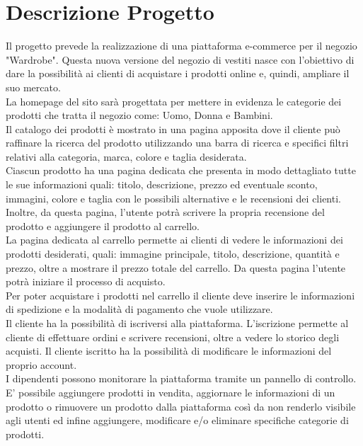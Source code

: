 \chapter{Descrizione Progetto}
\label{ch:DescrizioneProgetto}
Il progetto prevede la realizzazione di una piattaforma e-commerce per il negozio "Wardrobe".
Questa nuova versione del negozio di vestiti nasce con l'obiettivo di dare la possibilità ai clienti di acquistare i prodotti online e, quindi, ampliare il suo mercato.\\
La homepage del sito sarà progettata per mettere in evidenza le categorie dei prodotti che tratta il negozio come: Uomo, Donna e Bambini.\\
Il catalogo dei prodotti è mostrato in una pagina apposita dove il cliente può raffinare la ricerca del prodotto utilizzando una barra di ricerca e specifici filtri relativi alla categoria, marca, colore e taglia desiderata.\\
Ciascun prodotto ha una pagina dedicata che presenta in modo dettagliato tutte le sue informazioni quali: titolo, descrizione, prezzo ed eventuale sconto, immagini, colore e taglia con le possibili alternative e le recensioni dei clienti. Inoltre, da questa pagina, l'utente potrà scrivere la propria recensione del prodotto e aggiungere il prodotto al carrello.\\
La pagina dedicata al carrello permette ai clienti di vedere le informazioni dei prodotti desiderati, quali: immagine principale, titolo, descrizione, quantità e prezzo, oltre a mostrare il prezzo totale del carrello. Da questa pagina l'utente potrà iniziare il processo di acquisto.\\
Per poter acquistare i prodotti nel carrello il cliente deve inserire le informazioni di spedizione e la modalità di pagamento che vuole utilizzare.\\
Il cliente ha la possibilità di iscriversi alla piattaforma. L'iscrizione permette al cliente di effettuare ordini e scrivere recensioni, oltre a vedere lo storico degli acquisti. Il cliente iscritto ha la possibilità di modificare le informazioni del proprio account.\\
I dipendenti possono monitorare la piattaforma tramite un pannello di controllo. E' possibile aggiungere prodotti in vendita, aggiornare le informazioni di un prodotto o rimuovere un prodotto dalla piattaforma così da non renderlo visibile agli utenti ed infine aggiungere, modificare e/o eliminare specifiche categorie di prodotti.\\